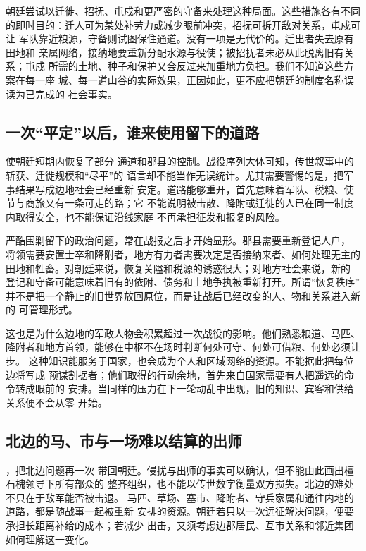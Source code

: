 朝廷尝试以迁徙、招抚、屯戍和更严密的守备来处理这种局面。这些措施各有不同
的即时目的：迁人可为某处补劳力或减少眼前冲突，招抚可拆开敌对关系，屯戍可让
军队靠近粮源，守备则试图保住通道。没有一项是无代价的。迁出者失去原有田地和
亲属网络，接纳地要重新分配水源与役使；被招抚者未必从此脱离旧有关系；屯戍
所需的土地、种子和保护又会反过来加重地方负担。我们不知道这些方案在每一座
城、每一道山谷的实际效果，正因如此，更不应把朝廷的制度名称误读为已完成的
社会事实。

\subsection{一次“平定”以后，谁来使用留下的道路}

使朝廷短期内恢复了部分
通道和郡县的控制。战役序列大体可知，传世叙事中的斩获、迁徙规模和“尽平”的
语言却不能当作无误统计。尤其需要警惕的是，把军事结果写成边地社会已经重新
安定。道路能够重开，首先意味着军队、税粮、使节与商旅又有一条可走的路；它
不能说明被击散、降附或迁徙的人已在同一制度内取得安全，也不能保证沿线家庭
不再承担征发和报复的风险。

严酷围剿留下的政治问题，常在战报之后才开始显形。郡县需要重新登记人户，
将领需要安置士卒和降附者，地方有力者需要决定是否接纳来者、如何处理无主的
田地和牲畜。对朝廷来说，恢复关隘和税源的诱惑很大；对地方社会来说，新的
登记和守备可能意味着旧有的依附、债务和土地争执被重新打开。所谓“恢复秩序”
并不是把一个静止的旧世界放回原位，而是让战后已经改变的人、物和关系进入新的
可管理形式。

这也是为什么边地的军政人物会积累超过一次战役的影响。他们熟悉粮道、马匹、
降附者和地方首领，能够在中枢不在场时判断何处可守、何处可借粮、何处必须让步。
这种知识能服务于国家，也会成为个人和区域网络的资源。不能据此把每位边将写成
预谋割据者；他们取得的行动余地，首先来自国家需要有人把遥远的命令转成眼前的
安排。当同样的压力在下一轮动乱中出现，旧的知识、宾客和供给关系便不会从零
开始。

\subsection{北边的马、市与一场难以结算的出师}

，把北边问题再一次
带回朝廷。侵扰与出师的事实可以确认，但不能由此画出檀石槐领导下所有部众的
整齐组织，也不能以传世数字衡量双方损失。北边的难处不只在于敌军能否被击退。
马匹、草场、塞市、降附者、守兵家属和通往内地的道路，都是随战事一起被重新
安排的资源。朝廷若只以一次远征解决问题，便要承担长距离补给的成本；若减少
出击，又须考虑边郡居民、互市关系和邻近集团如何理解这一变化。

